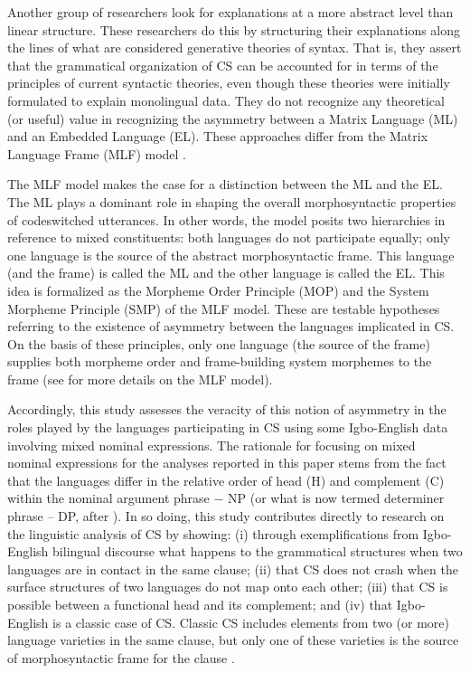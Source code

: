 \documentclass[output=paper]{langsci/langscibook}
\begin{document}
Another group of researchers look for explanations at a more abstract level than linear structure. These researchers \citep{BelaziEtAl1994,DiSciulloEtAl1986,MacSwan2009} do this by structuring their explanations along the lines of what are considered generative theories of syntax. That is, they assert that the grammatical organization of CS can be accounted for in terms of the principles of current syntactic theories, even though these theories were initially formulated to explain monolingual data. They do not recognize any theoretical (or useful) value in recognizing the asymmetry between a Matrix Language (ML) and an Embedded Language (EL). These approaches differ from the Matrix Language Frame (MLF) model \citep{MyersScotton1993,MyersScotton1997,MyersScotton2002,MyersScotton2013}.

The MLF model makes the case for a distinction between the ML and the EL. The ML plays a dominant role in shaping the overall morphosyntactic properties of codeswitched utterances. In other words, the model posits two hierarchies in reference to mixed constituents: both languages do not participate equally; only one language is the source of the abstract morphosyntactic frame. This language (and the frame) is called the ML and the other language is called the EL. This idea is formalized as the Morpheme Order Principle (MOP) and the System Morpheme Principle (SMP) of the MLF model. These are testable hypotheses referring to the existence of asymmetry between the languages implicated in CS. On the basis of these principles, only one language (the source of the frame) supplies both morpheme order and frame-building system morphemes to the frame (see  for more details on the MLF model). 

Accordingly, this study assesses the veracity of this notion of asymmetry in the roles played by the languages participating in CS using some Igbo-English data involving mixed nominal expressions. The rationale for focusing on mixed nominal expressions for the analyses reported in this paper stems from the fact that the languages differ in the relative order of head (H) and complement (C) within the nominal argument phrase $-$ NP (or what is now termed determiner phrase – DP, after \citealt{Abney1987}). In so doing, this study contributes directly to research on the linguistic analysis of CS by showing: (i) through exemplifications from Igbo-English bilingual discourse what happens to the grammatical structures when two languages are in contact in the same clause; (ii) that CS does not crash when the surface structures of two languages do not map onto each other; (iii) that CS is possible between a functional head and its complement; and (iv) that Igbo-English is a classic case of CS. Classic CS includes elements from two (or more) language varieties in the same clause, but only one of these varieties is the source of morphosyntactic frame for the clause \citep[8]{MyersScotton2002}.
\end{document}
